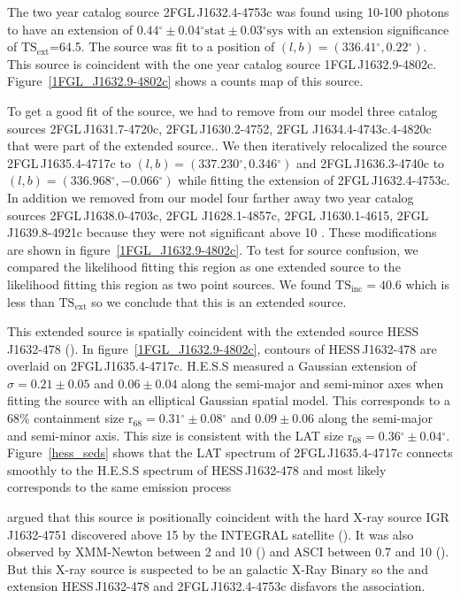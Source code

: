 \documentclass[12pt,preprint]{aastex}
\newcommand{\kev}{\text{Kev}\xspace}
\newcommand{\gev}{\text{GeV}\xspace}
\newcommand{\tev}{\text{TeV}\xspace}
\newcommand{\tsext}{{\ensuremath{\text{TS}_{\text{ext}}}}\xspace}
\newcommand{\tsinc}{\ensuremath{\text{TS}_{\text{inc}}}\xspace}
\newcommand{\rsixeight}{{\ensuremath{\text{r}_{68}}}\xspace}
\newcommand{\sys}{\text{sys}\xspace}
\newcommand{\stat}{\text{stat}\xspace}
\renewcommand{\deg}{\ensuremath{^\circ}\xspace}
\begin{document}
The two year catalog source 2FGL\,J1632.4-4753c was found 
using 10-100 \gev photons to
have an extension of $0.44\deg\pm0.04\deg\stat\pm0.03\deg\sys$ 
with an extension
significance of \tsext=64.5.  The source was fit to a position of
$(l,b)=(336.41\deg,0.22\deg)$.  This source is coincident with the one
year catalog source 1FGL\,J1632.9-4802c.  Figure~\ref{1FGL_J1632.9-4802c}
shows a counts map of this source.

To get a good fit of the source, we had to remove from our model
three catalog sources 2FGL\,J1631.7-4720c, 2FGL\,J1630.2-4752,
2FGL J1634.4-4743c.4-4820c that were part of the extended source..
We then iteratively relocalized the source 2FGL\,J1635.4-4717c
to $(l,b)=(337.230\deg,0.346\deg)$ and 2FGL\,J1636.3-4740c to
$(l,b)=(336.968\deg,-0.066\deg)$ while fitting the extension of
2FGL\,J1632.4-4753c.  In addition we removed from our model four
farther away two year catalog sources 2FGL\,J1638.0-4703c, 2FGL
J1628.1-4857c, 2FGL  J1630.1-4615, 2FGL\,J1639.8-4921c because they
were not significant above 10 \gev.  These modifications are shown
in figure~\ref{1FGL_J1632.9-4802c}.  To test for source confusion,
we compared the likelihood fitting this region as one extended source
to the likelihood fitting this region as two point sources. We found
$\tsinc=40.6$ which is less than \tsext so we conclude
that this is an extended source.

This extended source is spatially coincident with the extended
\tev source HESS\,J1632-478 (\cite{hess_plane_survey}).  In
figure~\ref{1FGL_J1632.9-4802c}, contours of  HESS\,J1632-478 are
overlaid on 2FGL\,J1635.4-4717c.  H.E.S.S measured a Gaussian extension of
$\sigma=0.21\pm0.05$ and $0.06\pm0.04$ along the semi-major and semi-minor
axes when fitting the source with an elliptical Gaussian spatial model.
This corresponds to a 68\% containment size $\rsixeight=0.31\deg\pm0.08\deg$
and $0.09\pm0.06$ along the semi-major and semi-minor axis. This
size is consistent with the LAT size $\rsixeight=0.36\deg\pm0.04\deg$.
Figure~\ref{hess_seds} shows that the LAT spectrum of 2FGL\,J1635.4-4717c
connects smoothly to the H.E.S.S spectrum of HESS\,J1632-478 and most
likely corresponds to the same emission process

\cite{hess_plane_survey} argued that this source is positionally
coincident with the hard X-ray source IGR\,J1632-4751 discovered above
15 \kev by the INTEGRAL satellite (\cite{Igr_J16320-4751_circ}).
It was also observed by XMM-Newton between 2 and 10 \kev
(\cite{xmm_newton_IGR_J16320-4751}) and ASCI between 0.7 and 10 \kev
(\cite{asca_plane_survey}).  But this X-ray source is suspected to be
an galactic X-Ray Binary so the \gev and \tev extension HESS\,J1632-478
and 2FGL\,J1632.4-4753c disfavors the association.
\end{document}
